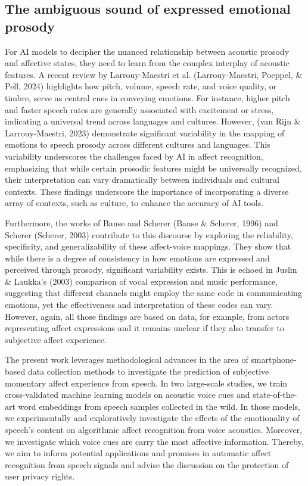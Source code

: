 \documentclass[
  english,
  man,floatsintext]{apa6}
\begin{document}
\hypertarget{the-ambiguous-sound-of-expressed-emotional-prosody}{%
\subsection{The ambiguous sound of expressed emotional prosody}\label{the-ambiguous-sound-of-expressed-emotional-prosody}}

For AI models to decipher the nuanced relationship between acoustic prosody and affective states, they need to learn from the complex interplay of acoustic features. A recent review by Larrouy-Maestri et al. (Larrouy-Maestri, Poeppel, \& Pell, 2024) highlights how pitch, volume, speech rate, and voice quality, or timbre, serve as central cues in conveying emotions. For instance, higher pitch and faster speech rates are generally associated with excitement or stress, indicating a universal trend across languages and cultures. However, (van Rijn \& Larrouy-Maestri, 2023) demonstrate significant variability in the mapping of emotions to speech prosody across different cultures and languages. This variability underscores the challenges faced by AI in affect recognition, emphasizing that while certain prosodic features might be universally recognized, their interpretation can vary dramatically between individuals and cultural contexts. These findings underscore the importance of incorporating a diverse array of contexts, such as culture, to enhance the accuracy of AI tools.

Furthermore, the works of Banse and Scherer (Banse \& Scherer, 1996) and Scherer (Scherer, 2003) contribute to this discourse by exploring the reliability, specificity, and generalizability of these affect-voice mappings. They show that while there is a degree of consistency in how emotions are expressed and perceived through prosody, significant variability exists. This is echoed in Juslin \& Laukka's (2003) comparison of vocal expression and music performance, suggesting that different channels might employ the same code in communicating emotions, yet the effectiveness and interpretation of these codes can vary. However, again, all those findings are based on data, for example, from actors representing affect expressions and it remains unclear if they also transfer to subjective affect experience.

The present work leverages methodological advances in the area of smartphone-based data collection methods to investigate the prediction of subjective momentary affect experience from speech. In two large-scale studies, we train cross-validated machine learning models on acoustic voice cues and state-of-the-art word embeddings from speech samples collected in the wild. In those models, we experimentally and exploratively investigate the effects of the emotionality of speech's content on algorithmic affect recognition from voice acoustics. Moreover, we investigate which voice cues are carry the most affective information. Thereby, we aim to inform potential applications and promises in automatic affect recognition from speech signals and advise the discussion on the protection of user privacy rights.
\end{document}
